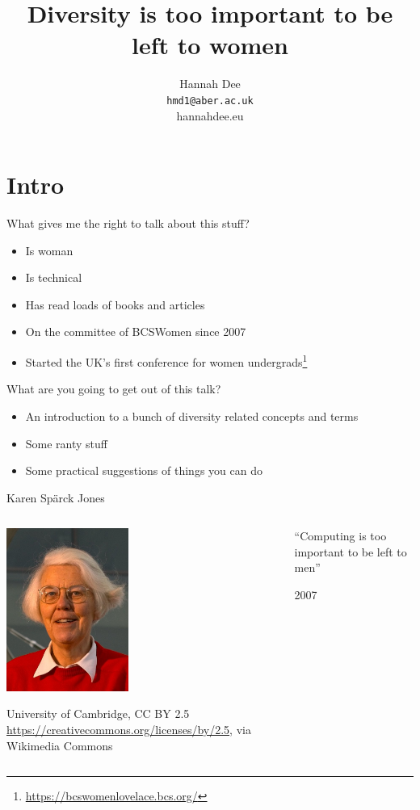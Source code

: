 \documentclass[xcolor=table,aspectratio=169]{beamer}
\title{Diversity is too important to be left to women}
\author[hmd1]{Hannah Dee \\
  \texttt{hmd1@aber.ac.uk} \\hannahdee.eu}
\date{}
\institute[]{ACCU 2022,  April 7
  Computer Science, Aberystwyth University\\BCSWomen }
\begin{document}
\begin{frame}
  \titlepage
\end{frame}


\section{Intro}

\begin{frame}{What gives me the right to talk about this stuff?}
	\begin{itemize}
		\item Is woman
		\item Is technical
		\item Has read loads of books and articles
		\item On the committee of BCSWomen since 2007
		\item Started the UK's first conference for women undergrads\footnote{\url{https://bcswomenlovelace.bcs.org/}}
	\end{itemize}
\end{frame}
\begin{frame}{What are you going to get out of this talk?}
	\begin{itemize}
		\item An introduction to a bunch of diversity related concepts and terms
		\item Some ranty stuff
		\item Some practical suggestions of things you can do
	\end{itemize}
\end{frame}

\begin{frame}{Karen Sp\"{a}rck Jones} 
	\begin{columns}
		\begin{column}{0.4\textwidth}

	\includegraphics[width=4cm]{ksj.jpg}

	\tiny{University of Cambridge, CC BY 2.5 \url{https://creativecommons.org/licenses/by/2.5}, via Wikimedia Commons}

		\end{column}
		\begin{column}{0.6\textwidth}

		``Computing is too important to be left to men''

			\vspace{0.5em}

			2007
		\end{column}
		\end{columns}
\end{frame}
\end{document}
